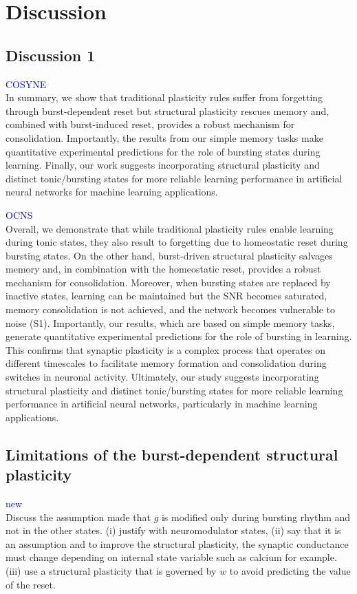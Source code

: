 %
%

\section{Discussion}
\subsection{Discussion 1}
\textcolor{blue}{COSYNE}\\
In summary, we show that traditional plasticity rules suffer from forgetting through burst-dependent reset but structural plasticity rescues memory and, combined with burst-induced reset, provides a robust mechanism for consolidation. Importantly, the results from our simple memory tasks make quantitative experimental predictions for the role of bursting states during learning. Finally, our work suggests incorporating structural plasticity and distinct tonic/bursting states for more reliable learning performance in artificial neural networks for machine learning applications. 



\textcolor{blue}{OCNS}\\
Overall, we demonstrate that while traditional plasticity rules enable learning during tonic states, they also result to forgetting due to homeostatic reset during bursting states. On the other hand, burst-driven structural plasticity salvages memory and, in combination with the homeostatic reset, provides a robust mechanism for consolidation. Moreover, when bursting states are replaced by inactive states, learning can be maintained but the SNR becomes saturated, memory consolidation is not achieved, and the network becomes vulnerable to noise (S1). Importantly, our results, which are based on simple memory tasks, generate quantitative experimental predictions for the role of bursting in learning. This confirms that synaptic plasticity is a complex process that operates on different timescales to facilitate memory formation and consolidation during switches in neuronal activity. Ultimately, our study suggests incorporating structural plasticity and distinct tonic/bursting states for more reliable learning performance in artificial neural networks, particularly in machine learning applications. 


\subsection{Limitations of the burst-dependent structural plasticity}
\textcolor{blue}{new}\\
Discuss the assumption made that $g$ is modified only during bursting rhythm and not in the other states. (i) justify with neuromodulator states, (ii) say that it is an assumption and to improve the structural plasticity, the synaptic conductance must change depending on internal state variable such as calcium for example. (iii) use a structural plasticity that is governed by $\dot{w}$ to avoid predicting the value of the reset. 


